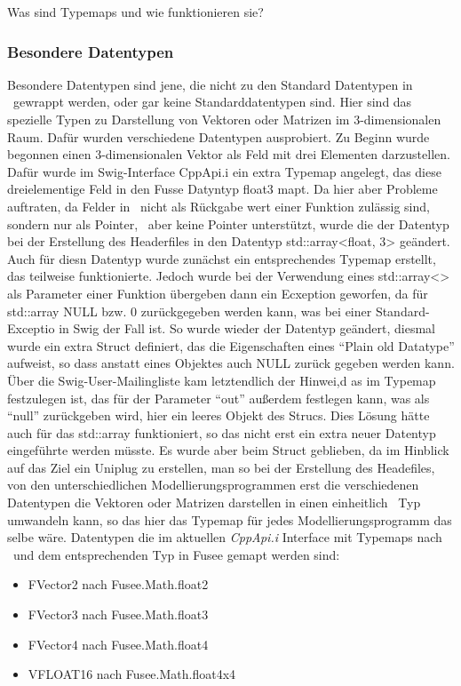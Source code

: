 Was sind Typemaps und wie funktionieren sie?\\

\subsubsection{Besondere Datentypen}\label{subsubsec:Datentypen}

Besondere Datentypen sind jene, die nicht zu den Standard Datentypen in \CS~gewrappt werden, oder gar keine Standarddatentypen sind. Hier sind das spezielle Typen zu Darstellung von Vektoren oder Matrizen im 3-dimensionalen Raum. Dafür wurden verschiedene Datentypen ausprobiert. Zu Beginn wurde begonnen einen 3-dimensionalen Vektor als Feld mit drei Elementen darzustellen. Dafür wurde im Swig-Interface CppApi.i ein extra Typemap angelegt, das diese dreielementige Feld in den Fusse Datyntyp float3 mapt. Da hier aber Probleme auftraten, da Felder in \CC~nicht als Rückgabe wert einer Funktion zulässig sind, sondern nur als Pointer, \CS~aber keine Pointer unterstützt, wurde die der Datentyp bei der Erstellung des Headerfiles in den Datentyp std::array<float, 3> geändert. Auch für diesn Datentyp wurde zunächst ein entsprechendes Typemap erstellt, das teilweise funktionierte. Jedoch wurde bei der Verwendung eines std::array<> als Parameter einer Funktion übergeben dann ein Ecxeption geworfen, da für std::array  NULL bzw. 0 zurückgegeben werden kann, was bei einer Standard-Exceptio in Swig der Fall ist. So wurde wieder der Datentyp geändert, diesmal wurde ein extra Struct definiert, das die Eigenschaften eines \enquote{Plain old Datatype} aufweist, so dass anstatt eines Objektes auch NULL zurück gegeben werden kann. Über die Swig-User-Mailingliste kam letztendlich der Hinwei,d as im Typemap festzulegen ist, das für der Parameter \enquote{out} außerdem festlegen kann, was als \enquote{null} zurückgeben wird, hier ein leeres Objekt des Strucs. Dies Lösung hätte auch für das std::array funktioniert, so das nicht erst ein extra neuer Datentyp eingeführte werden müsste. Es wurde aber beim Struct geblieben, da im Hinblick auf das Ziel ein Uniplug zu erstellen, man so bei der Erstellung des Headefiles, von den unterschiedlichen Modellierungsprogrammen erst die verschiedenen Datentypen die Vektoren oder Matrizen darstellen in einen einheitlich \CC~Typ umwandeln kann, so das hier das Typemap für jedes Modellierungsprogramm das selbe wäre. 
Datentypen die im aktuellen \emph{CppApi.i} Interface mit Typemaps nach \CS~und dem entsprechenden Typ in Fusee gemapt werden sind:\\
\begin{itemize}
	\item FVector2 nach Fusee.Math.float2
	\item FVector3 nach Fusee.Math.float3
	\item FVector4 nach Fusee.Math.float4
	\item VFLOAT16 nach Fusee.Math.float4x4
\end{itemize}

